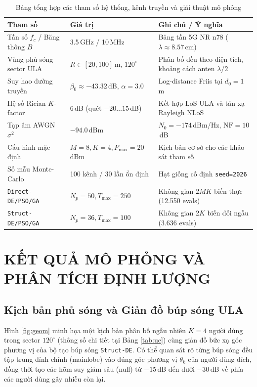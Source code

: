 \documentclass[12pt, a4paper]{article}
\begin{document}
\begin{table}[H]
    \centering
    \caption{Bảng tổng hợp các tham số hệ thống, kênh truyền và giải thuật mô phỏng}
    \label{tab:params}
    \renewcommand{\arraystretch}{1.2}
    \begin{tabularx}{\textwidth}{l l X}
        \toprule
        \textbf{Tham số} & \textbf{Giá trị} & \textbf{Ghi chú / Ý nghĩa} \\
        \midrule
        Tần số $f_c$ / Băng thông $B$ & 3.5\,GHz / 10\,MHz & Băng tần 5G NR n78 ($\lambda \approx 8.57$\,cm) \\
        Vùng phủ sóng sector ULA & $R \in [20, 100]$\,m, $120^\circ$ & Phân bố đều theo diện tích, khoảng cách anten $\lambda/2$ \\
        Suy hao đường truyền & $\beta_0 \approx -43.32$\,dB, $\alpha = 3.0$ & Log-distance Friis tại $d_0 = 1$\,m \cite{rappaport2002} \\
        Hệ số Rician $K$-factor & $6$\,dB (quét $-20 \dots 15$\,dB) & Kết hợp LoS ULA và tán xạ Rayleigh NLoS \\
        Tạp âm AWGN $\sigma^2$ & $-94.0$\,dBm & $N_0 = -174$\,dBm/Hz, $\text{NF} = 10$\,dB \\
        Cấu hình mặc định & $M=8, K=4, P_{\max}=20$\,dBm & Kịch bản cơ sở cho các khảo sát tham số \\
        Số mẫu Monte-Carlo & 100 kênh / 30 lần ổn định & Hạt giống cố định \texttt{seed=2026} \\
        \texttt{Direct-DE/PSO/GA} & $N_p=50, T_{\max}=250$ & Không gian $2MK$ biến thực (12.550 evals) \\
        \texttt{Struct-DE/PSO/GA} & $N_p=36, T_{\max}=100$ & Không gian $2K$ biến đối ngẫu (3.636 evals) \\
        \bottomrule
    \end{tabularx}
\end{table}

\section{KẾT QUẢ MÔ PHỎNG VÀ PHÂN TÍCH ĐỊNH LƯỢNG}

\subsection{Kịch bản phủ sóng và Giản đồ búp sóng ULA}
Hình \ref{fig:geom} minh họa một kịch bản phân bố ngẫu nhiên $K=4$ người dùng trong sector $120^\circ$ (thông số chi tiết tại Bảng \ref{tab:ue}) cùng giản đồ bức xạ góc phương vị của bộ tạo búp sóng \texttt{Struct-DE}. Có thể quan sát rõ từng búp sóng đều tập trung đỉnh chính (mainlobe) vào đúng góc phương vị $\theta_k$ của người dùng đích, đồng thời tạo các hõm suy giảm sâu (null) từ $-15$\,dB đến dưới $-30$\,dB về phía các người dùng gây nhiễu còn lại.
\end{document}
